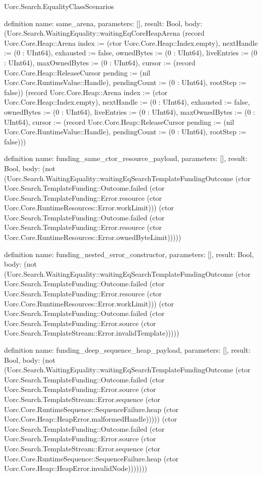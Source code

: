\begin{lexlean}{Uorc.Search.EqualityClassScenarios}
\begin{semanticmodule}
definition{
  name: same_arena,
  parameters: [],
  result: Bool,
  body: (Uorc.Search.WaitingEquality::waitingEqCoreHeapArena (record Uorc.Core.Heap::Arena {index := (ctor Uorc.Core.Heap::Index.empty), nextHandle := (0 : UInt64), exhausted := false, ownedBytes := (0 : UInt64), liveEntries := (0 : UInt64), maxOwnedBytes := (0 : UInt64), cursor := (record Uorc.Core.Heap::ReleaseCursor {pending := (nil Uorc.Core.RuntimeValue::Handle), pendingCount := (0 : UInt64), rootStep := false})}) (record Uorc.Core.Heap::Arena {index := (ctor Uorc.Core.Heap::Index.empty), nextHandle := (0 : UInt64), exhausted := false, ownedBytes := (0 : UInt64), liveEntries := (0 : UInt64), maxOwnedBytes := (0 : UInt64), cursor := (record Uorc.Core.Heap::ReleaseCursor {pending := (nil Uorc.Core.RuntimeValue::Handle), pendingCount := (0 : UInt64), rootStep := false})}))
}

definition{
  name: funding_same_ctor_resource_payload,
  parameters: [],
  result: Bool,
  body: (not (Uorc.Search.WaitingEquality::waitingEqSearchTemplateFundingOutcome (ctor Uorc.Search.TemplateFunding::Outcome.failed (ctor Uorc.Search.TemplateFunding::Error.resource (ctor Uorc.Core.RuntimeResources::Error.workLimit))) (ctor Uorc.Search.TemplateFunding::Outcome.failed (ctor Uorc.Search.TemplateFunding::Error.resource (ctor Uorc.Core.RuntimeResources::Error.ownedByteLimit)))))
}

definition{
  name: funding_nested_error_constructor,
  parameters: [],
  result: Bool,
  body: (not (Uorc.Search.WaitingEquality::waitingEqSearchTemplateFundingOutcome (ctor Uorc.Search.TemplateFunding::Outcome.failed (ctor Uorc.Search.TemplateFunding::Error.resource (ctor Uorc.Core.RuntimeResources::Error.workLimit))) (ctor Uorc.Search.TemplateFunding::Outcome.failed (ctor Uorc.Search.TemplateFunding::Error.source (ctor Uorc.Search.TemplateStream::Error.invalidTemplate)))))
}

definition{
  name: funding_deep_sequence_heap_payload,
  parameters: [],
  result: Bool,
  body: (not (Uorc.Search.WaitingEquality::waitingEqSearchTemplateFundingOutcome (ctor Uorc.Search.TemplateFunding::Outcome.failed (ctor Uorc.Search.TemplateFunding::Error.source (ctor Uorc.Search.TemplateStream::Error.sequence (ctor Uorc.Core.RuntimeSequence::SequenceFailure.heap (ctor Uorc.Core.Heap::HeapError.malformedHandle))))) (ctor Uorc.Search.TemplateFunding::Outcome.failed (ctor Uorc.Search.TemplateFunding::Error.source (ctor Uorc.Search.TemplateStream::Error.sequence (ctor Uorc.Core.RuntimeSequence::SequenceFailure.heap (ctor Uorc.Core.Heap::HeapError.invalidNode)))))))
}


\end{semanticmodule}
\end{lexlean}
